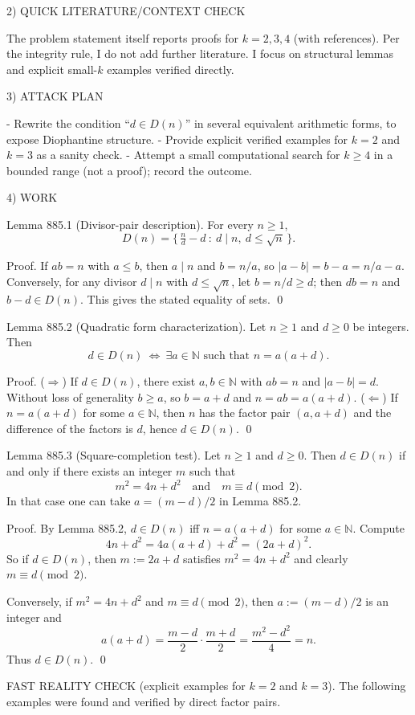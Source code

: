 2) QUICK LITERATURE/CONTEXT CHECK

The problem statement itself reports proofs for $k=2,3,4$ (with references). Per the integrity rule, I do not add further literature. I focus on structural lemmas and explicit small-$k$ examples verified directly.

3) ATTACK PLAN

- Rewrite the condition “$d\in D(n)$” in several equivalent arithmetic forms, to expose Diophantine structure.
- Provide explicit verified examples for $k=2$ and $k=3$ as a sanity check.
- Attempt a small computational search for $k\ge 4$ in a bounded range (not a proof); record the outcome.

4) WORK

Lemma 885.1 (Divisor-pair description).
For every $n\ge 1$,
\[D(n)=\{\,\tfrac{n}{d}-d\ :\ d\mid n,\ d\le \sqrt n\,\}.
\]

Proof.
If $ab=n$ with $a\le b$, then $a\mid n$ and $b=n/a$, so $|a-b|=b-a=n/a-a$.
Conversely, for any divisor $d\mid n$ with $d\le \sqrt n$, let $b=n/d\ge d$; then $db=n$ and $b-d\in D(n)$.
This gives the stated equality of sets. \qed

Lemma 885.2 (Quadratic form characterization).
Let $n\ge 1$ and $d\ge 0$ be integers. Then
\[d\in D(n)\ \Longleftrightarrow\ \exists a\in\mathbb N\text{ such that }n=a(a+d).
\]

Proof.
($\Rightarrow$) If $d\in D(n)$, there exist $a,b\in\mathbb N$ with $ab=n$ and $|a-b|=d$. Without loss of generality $b\ge a$, so $b=a+d$ and $n=ab=a(a+d)$.
($\Leftarrow$) If $n=a(a+d)$ for some $a\in\mathbb N$, then $n$ has the factor pair $(a,a+d)$ and the difference of the factors is $d$, hence $d\in D(n)$.
\qed

Lemma 885.3 (Square-completion test).
Let $n\ge 1$ and $d\ge 0$. Then $d\in D(n)$ if and only if there exists an integer $m$ such that
\[m^2=4n+d^2\quad\text{and}\quad m\equiv d\pmod 2.
\]
In that case one can take $a=(m-d)/2$ in Lemma 885.2.

Proof.
By Lemma 885.2, $d\in D(n)$ iff $n=a(a+d)$ for some $a\in\mathbb N$.
Compute
\[4n+d^2=4a(a+d)+d^2=(2a+d)^2.
\]
So if $d\in D(n)$, then $m:=2a+d$ satisfies $m^2=4n+d^2$ and clearly $m\equiv d\pmod 2$.

Conversely, if $m^2=4n+d^2$ and $m\equiv d\pmod2$, then $a:=(m-d)/2$ is an integer and
\[a(a+d)=\frac{m-d}{2}\cdot\frac{m+d}{2}=\frac{m^2-d^2}{4}=n.
\]
Thus $d\in D(n)$. \qed

FAST REALITY CHECK (explicit examples for $k=2$ and $k=3$).
The following examples were found and verified by direct factor pairs.

